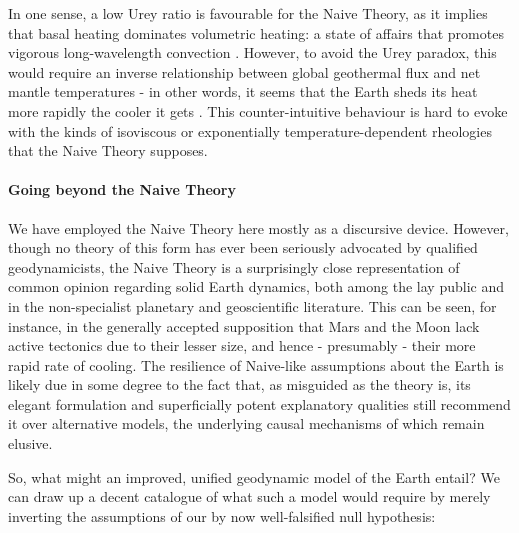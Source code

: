 \documentclass[a4paper,11pt,oneside]{book}
\begin{document}
In one sense, a low Urey ratio is favourable for the Naive Theory, as it implies that basal heating dominates volumetric heating: a state of affairs that promotes vigorous long-wavelength convection \citet{Weller2016-cc, Wolstencroft2009-bz}. However, to avoid the Urey paradox, this would require an inverse relationship between global geothermal flux and net mantle temperatures - in other words, it seems that the Earth sheds its heat more rapidly the cooler it gets \cite{Korenaga2003-oy}. This counter-intuitive behaviour is hard to evoke with the kinds of isoviscous or exponentially temperature-dependent rheologies that the Naive Theory supposes.

\paragraph{Going beyond the Naive Theory}

We have employed the Naive Theory here mostly as a discursive device. However, though no theory of this form has ever been seriously advocated by qualified geodynamicists, the Naive Theory is a surprisingly close representation of common opinion regarding solid Earth dynamics, both among the lay public and in the non-specialist planetary and geoscientific literature. This can be seen, for instance, in the generally accepted supposition that Mars and the Moon lack active tectonics due to their lesser size, and hence - presumably - their more rapid rate of cooling. The resilience of Naive-like assumptions about the Earth is likely due in some degree to the fact that, as misguided as the theory is, its elegant formulation and superficially potent explanatory qualities still recommend it over alternative models, the underlying causal mechanisms of which remain elusive.

So, what might an improved, unified geodynamic model of the Earth entail? We can draw up a decent catalogue of what such a model would require by merely inverting the assumptions of our by now well-falsified null hypothesis:
\end{document}
